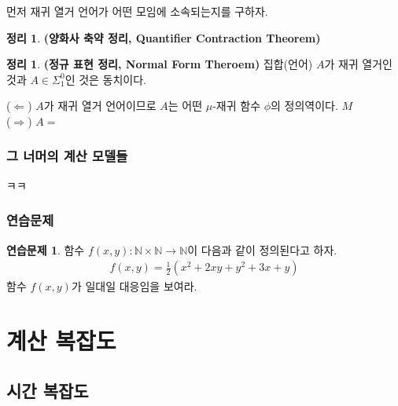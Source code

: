 \documentclass[b5paper, 11pt]{book}
\theoremstyle{definition}
\newtheorem{thm}[defn]{정리}
\newtheorem{ec}{연습문제}[chapter]
\newenvironment{pf*}{\pushQED{\qed}\pf}
{\popQED\endpf}
\begin{document}
먼저 재귀 열거 언어가 어떤 모임에 소속되는지를 구하자. 
\begin{thm}
    \textbf{(양화사 축약 정리, Quantifier Contraction Theorem)}
    
\end{thm}
\begin{thm}
    \textbf{(정규 표현 정리, Normal Form Theroem)} 집합(언어) $A$가 재귀 열거인 것과 $A \in \Sigma_1^0$인 것은 동치이다. 
\end{thm}
\begin{pf*}
    ($\Leftarrow$) $A$가 재귀 열거 언어이므로 $A$는 어떤 $\mu$-재귀 함수 $\phi$의 정의역이다. $M$ \\
    ($\Rightarrow$) $A = $
\end{pf*}
\section{그 너머의 계산 모델들}
ㅋㅋ
\section{연습문제}
\begin{ec}\label{1to1x,y}
    함수 $f(x, y): \mathbb{N} \times \mathbb{N} \rightarrow \mathbb{N} $이 다음과 같이 정의된다고 하자.
    \begin{align*}
        f(x, y) = \frac{1}{2}(x^2 + 2xy + y^2 + 3x + y)
    \end{align*}
    함수 $f(x, y)$가 일대일 대응임을 보여라.
\end{ec}
\part{계산 복잡도}
\chapter{시간 복잡도}
\end{document}

